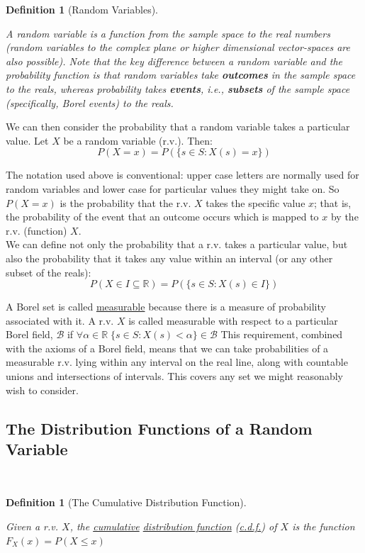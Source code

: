 \documentclass[12pt,a4paper]{article}
\newtheorem{defn}[thm]{Definition}
\begin{document}
\begin{defn}[Random Variables]$\;$\par
\vspace{1cm}

A random variable is a function from the sample space to the real numbers (random variables to the complex plane or higher dimensional vector-spaces are also possible). Note that the key difference between a random variable and the probability function is that random variables take {\bf outcomes} in the sample space to the reals, whereas probability takes {\bf events}, i.e., {\bf subsets} of the sample space (specifically, Borel events) to the reals.
\end{defn}

We can then consider the probability that a random variable takes a particular value. Let $X$ be a random variable (r.v.). Then:
$$P(X = x) = P(\{s \in S : X(s) = x\})$$

The notation used above is conventional: upper case letters are normally used for random variables and lower case for particular values they might take on. So $P(X = x)$ is the probability that the r.v. $X$ takes the specific value $x$; that is, the probability of the event that an outcome occurs which is mapped to $x$ by the r.v. (function) $X$.\\
\indent We can define not only the probability that a r.v. takes a particular value, but also the probability that it takes any value within an interval (or any other subset of the reals):
$$P(X \in I \subseteq \mathbb{R}) = P(\{s \in S : X(s) \in I\})$$

A Borel set is called \underline{measurable} because there is a measure of probability associated with it. A r.v. $X$ is called measurable with respect to a particular Borel field, $\mathcal{B}$ if $\forall \alpha \in \mathbb{R} \; \{s \in S : X(s) < \alpha\} \in \mathcal{B}$ This requirement, combined with the axioms of a Borel field, means that we can take probabilities of a measurable r.v. lying within any interval on the real line, along with countable unions and intersections of intervals. This covers any set we might reasonably wish to consider.

\subsection{The Distribution Functions of a Random Variable}$\;$

\begin{defn}[The Cumulative Distribution Function]$\;$\par
\vspace{1cm}

Given a r.v. $X$, the \underline{cumulative} \underline{distribution function} (\underline{c.d.f.}) of $X$ is the function $F_X(x) = P(X \leq x)$
\end{defn}
\end{document}
